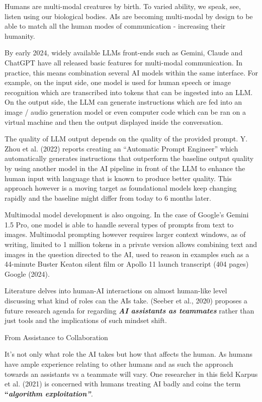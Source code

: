\documentclass[
  letterpaper,
  DIV=11,
  numbers=noendperiod]{scrartcl}
\begin{document}
Humans are multi-modal creatures by birth. To varied ability, we speak,
see, listen using our biological bodies. AIs are becoming multi-modal by
design to be able to match all the human modes of communication -
increasing their humanity.

By early 2024, widely available LLMs front-ends such as Gemini, Claude
and ChatGPT have all released basic features for multi-modal
communication. In practice, this means combination several AI models
within the same interface. For example, on the input side, one model is
used for human speech or image recognition which are transcribed into
tokens that can be ingested into an LLM. On the output side, the LLM can
generate instructions which are fed into an image / audio generation
model or even computer code which can be ran on a virtual machine and
then the output displayed inside the conversation.

The quality of LLM output depends on the quality of the provided prompt.
Y. Zhou et al. (2022) reports creating an ``Automatic Prompt Engineer''
which automatically generates instructions that outperform the baseline
output quality by using another model in the AI pipeline in front of the
LLM to enhance the human input with language that is known to produce
better quality. This approach however is a moving target as foundational
models keep changing rapidly and the baseline might differ from today to
6 months later.

Multimodal model development is also ongoing. In the case of Google's
Gemini 1.5 Pro, one model is able to handle several types of prompts
from text to images. Multimodal prompting however requires larger
context windows, as of writing, limited to 1 million tokens in a private
version allows combining text and images in the question directed to the
AI, used to reason in examples such as a 44-minute Buster Keaton silent
film or Apollo 11 launch transcript (404 pages) Google (2024).

Literature delves into human-AI interactions on almost human-like level
discussing what kind of roles can the AIs take. (Seeber et al., 2020)
proposes a future research agenda for regarding \textbf{\emph{AI
assistants as teammates}} rather than just tools and the implications of
such mindset shift.

From Assistance to Collaboration

It's not only what role the AI takes but how that affects the human. As
humans have ample experience relating to other humans and as such the
approach towards an assistants vs a teammate will vary. One researcher
in this field Karpus et al. (2021) is concerned with humans treating AI
badly and coins the term \textbf{``\emph{algorithm
exploitation''}}\emph{.}
\end{document}
